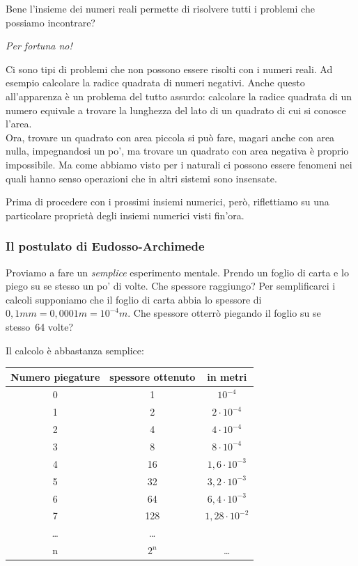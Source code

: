 Bene l'insieme dei numeri reali permette di risolvere tutti i problemi che 
possiamo incontrare?
\vspace{-1em}
\begin{center} \emph{Per fortuna no!} \end{center}
\vspace{-.5em}
Ci sono tipi di problemi che non possono essere risolti con i numeri reali.
Ad esempio calcolare la radice quadrata di numeri negativi. 
Anche questo all'apparenza è un problema del tutto assurdo: calcolare la 
radice quadrata di un numero equivale a trovare la lunghezza del lato di un 
quadrato di cui si conosce l'area. \\
Ora, trovare un quadrato con area piccola si può fare, magari anche con 
area nulla, impegnandosi un po', ma trovare un quadrato con area negativa 
è proprio impossibile. 
Ma come abbiamo visto per i naturali ci possono essere fenomeni nei quali 
hanno senso operazioni che in altri sistemi sono insensate.

Prima di procedere con i prossimi insiemi numerici, però, riflettiamo su 
una particolare proprietà degli insiemi numerici visti fin'ora.

\subsubsection{Il postulato di Eudosso-Archimede}

Proviamo a fare un \emph{semplice} esperimento mentale. Prendo un foglio di 
carta e lo piego su se stesso un po' di volte. Che spessore raggiungo?
Per semplificarci i calcoli supponiamo che il foglio di carta abbia lo 
spessore di \(0,1mm = 0,0001m = 10^{-4}m\). 
Che spessore otterrò piegando il foglio su se stesso~64 volte?

Il calcolo è abbastanza semplice:

\begin{center}
 \begin{tabular}{ccc}
\toprule
Numero piegature & spessore ottenuto & in metri\\
\midrule
0 & 1 & \(10^{-4}\)\\
1 & 2 & \(2 \cdot 10^{-4}\)\\
2 & 4 & \(4 \cdot 10^{-4}\)\\
3 & 8 & \(8 \cdot 10^{-4}\)\\
4 & 16 & \(1,6 \cdot 10^{-3}\)\\
5 & 32 & \(3,2 \cdot 10^{-3}\)\\
6 & 64 & \(6,4 \cdot 10^{-3}\)\\
7 & 128 & \(1,28 \cdot 10^{-2}\)\\
\ldots& \ldots\\
n & \(2^n\) & \ldots\\
\bottomrule
\end{tabular}
\end{center}

